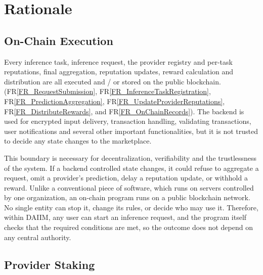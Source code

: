 \documentclass[12pt]{article}
\newcommand{\rref}[1]{FR\ref{#1}}
\begin{document}
\begin{longtable}{p{} p{}}
\end{longtable}


\section{Rationale}


\subsection{On-Chain Execution}

Every inference task, inference request, the provider registry and per-task
reputations, final aggregation, reputation updates, reward calculation and
distribution are all executed and / or stored on the public blockchain.
(\rref{FR_RequestSubmission}, \rref{FR_InferenceTaskRegistration},
\rref{FR_PredictionAggregation}, \rref{FR_UpdateProviderReputations},
\rref{FR_DistributeRewards}, and \rref{FR_OnChainRecords}). The backend is used for encrypted input delivery, transaction handling, validating transactions, user
notifications and several other important functionalities, but it is not trusted to decide any state changes to the
marketplace.

This boundary is necessary for decentralization, verifiability and the trustlessness of the system.
If a backend controlled state changes, it could refuse to aggregate a request, omit a provider's
prediction, delay a reputation update, or withhold a reward. Unlike a conventional piece of software, which
runs on servers controlled by one organization, an on-chain program runs on a public blockchain 
network. No single entity can stop it, change its rules, or decide who may use it. Therefore, within DAIIM, any user can 
start an inference request, and the program itself checks that the required conditions are
met, so the outcome does not depend on any central authority.

\subsection{Provider Staking}
\end{document}
